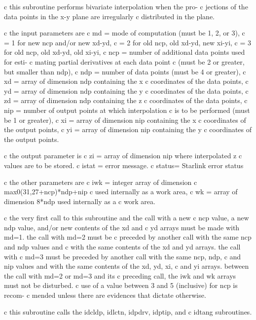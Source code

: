 \documentclass[11pt,twoside,nolof]{starlink}
\begin{document}
\begin{terminalv}
c this subroutine performs bivariate interpolation when the pro-
c jections of the data points in the x-y plane are irregularly
c distributed in the plane.

c the input parameters are
c     md  = mode of computation (must be 1, 2, or 3),
c         = 1 for new ncp and/or new xd-yd,
c         = 2 for old ncp, old xd-yd, new xi-yi,
c         = 3 for old ncp, old xd-yd, old xi-yi,
c     ncp = number of additional data points used for esti-
c           mating partial derivatives at each data point
c           (must be 2 or greater, but smaller than ndp),
c     ndp = number of data points (must be 4 or greater),
c     xd  = array of dimension ndp containing the x
c           coordinates of the data points,
c     yd  = array of dimension ndp containing the y
c           coordinates of the data points,
c     zd  = array of dimension ndp containing the z
c           coordinates of the data points,
c     nip = number of output points at which interpolation
c           is to be performed (must be 1 or greater),
c     xi  = array of dimension nip containing the x
c           coordinates of the output points,
c     yi  = array of dimension nip containing the y
c           coordinates of the output points.

c the output parameter is
c     zi  = array of dimension nip where interpolated z
c           values are to be stored.
c     istat = error message.
c     status= Starlink error status

c the other parameters are
c     iwk = integer array of dimension
c              max0(31,27+ncp)*ndp+nip
c           used internally as a work area,
c     wk  = array of dimension 8*ndp used internally as a
c           work area.

c the very first call to this subroutine and the call with a new
c ncp value, a new ndp value, and/or new contents of the xd and
c yd arrays must be made with md=1.  the call with md=2 must be
c preceded by another call with the same ncp and ndp values and
c with the same contents of the xd and yd arrays.  the call with
c md=3 must be preceded by another call with the same ncp, ndp,
c and nip values and with the same contents of the xd, yd, xi,
c and yi arrays.  between the call with md=2 or md=3 and its
c preceding call, the iwk and wk arrays must not be disturbed.
c use of a value between 3 and 5 (inclusive) for ncp is recom-
c mended unless there are evidences that dictate otherwise.

c this subroutine calls the idcldp, idlctn, idpdrv, idptip, and
c idtang subroutines.
\end{terminalv}
\end{document}
